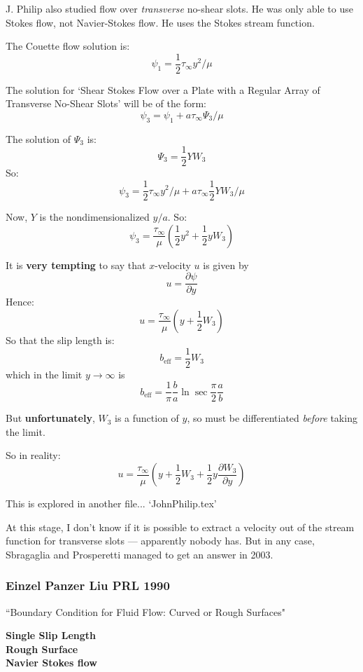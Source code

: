 \documentclass{article}
\begin{document}
J. Philip also studied flow over \emph{transverse} no-shear slots.  He was only able to use Stokes flow, not Navier-Stokes flow.  He uses the Stokes stream function.

The Couette flow solution is:
\[ \psi_{1} = \frac{1}{2} \tau_{\infty} y^{2}/\mu \]

The solution for `Shear Stokes Flow over a Plate with a Regular Array of Transverse No-Shear Slots' will be of the form:
\[ \psi_{3} = \psi_{1} + a \tau_{\infty} \Psi_{3} /\mu\]

The solution of $\Psi_{3}$ is: \[ \Psi_{3} = \frac{1}{2} Y W_{3} \]
So: 
\[ \psi_{3} = \frac{1}{2} \tau_{\infty} y^{2}/\mu
            + a \tau_{\infty} \frac{1}{2} Y W_{3} /\mu  \]            

Now, $Y$ is the nondimensionalized $y/a$. So:
\[ \psi_{3} = \frac{\tau_{\infty}}{\mu} \left( \frac{1}{2} y^{2}
            + \frac{1}{2} y W_{3} \right)  \]      

It is \textbf{very tempting} to say that $x$-velocity $u$ is given by
\[ u = \frac{\partial \psi}{\partial y} \]
Hence:
\[ u = \frac{\tau_{\infty}}{\mu} \left( y
            + \frac{1}{2} W_{3} \right)  \]
So that the slip length is:
\[ b_{\mathrm{eff}} = \frac{1}{2} W_{3}\]
which in the limit $y \rightarrow \infty$ is 
\[ b_{\mathrm{eff}} = \frac{1}{\pi} \frac{b}{a} \ln \sec \frac{\pi}{2} \frac{a}{b} \]

But \textbf{unfortunately}, $W_{3}$ is a function of $y$, so must be differentiated \emph{before} taking the limit.

So in reality:
\[ u = \frac{\tau_{\infty}}{\mu} \left( y
            + \frac{1}{2} W_{3}
            + \frac{1}{2} y \frac{\partial W_{3}}{\partial y} \right) \]
            
This is explored in another file... `JohnPhilip.tex'

At this stage, I don't know if it is possible to extract a velocity out of the stream function for transverse slots --- apparently nobody has. But in any case, Sbragaglia and Prosperetti managed to get an answer in 2003.


\subsubsection*{Einzel Panzer Liu PRL 1990}

``Boundary Condition for Fluid Flow: Curved or Rough Surfaces"

\textbf{Single Slip Length}\\
\textbf{Rough Surface}\\
\textbf{Navier Stokes flow}\\
\end{document}
